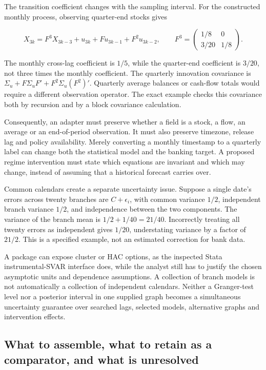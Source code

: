 The transition coefficient changes with the sampling interval. For the
constructed monthly process, observing quarter-end stocks gives

\[
 X_{3k}=F^3X_{3k-3}+u_{3k}+Fu_{3k-1}+F^2u_{3k-2},\qquad
 F^3=\begin{pmatrix}1/8&0\\3/20&1/8\end{pmatrix}.
\]

The monthly cross-lag coefficient is \(1/5\), while the quarter-end
coefficient is \(3/20\), not three times the monthly coefficient. The
quarterly innovation covariance is
\(\Sigma_u+F\Sigma_uF'+F^2\Sigma_u(F^2)'\). Quarterly average balances
or cash-flow totals would require a different observation operator. The
exact example checks this covariance both by recursion and by a block
covariance calculation.~\citep{exec13_ct_examples}

Consequently, an adapter must preserve whether a field is a stock, a
flow, an average or an end-of-period observation. It must also preserve
timezone, release lag and policy availability. Merely converting a
monthly timestamp to a quarterly label can change both the statistical
model and the banking target. A proposed regime intervention must state
which equations are invariant and which may change, instead of assuming
that a historical forecast carries over.

Common calendars create a separate uncertainty issue. Suppose a single
date's errors across twenty branches are \(C+\epsilon_i\), with common
variance \(1/2\), independent branch variance \(1/2\), and independence
between the two components. The variance of the branch mean is
\(1/2+1/40=21/40\). Incorrectly treating all twenty errors as
independent gives \(1/20\), understating variance by a factor of
\(21/2\). This is a specified example, not an estimated correction for
bank data. \citep{exec13_ct_examples}

A package can expose cluster or HAC options, as the inspected Stata
instrumental-SVAR interface does, while the analyst still has to justify
the chosen asymptotic units and dependence assumptions. A collection of
branch models is not automatically a collection of independent
calendars. Neither a Granger-test level nor a posterior interval in one
supplied graph becomes a simultaneous uncertainty guarantee over
searched lags, selected models, alternative graphs and intervention
effects.

\hypertarget{what-to-assemble-what-to-retain-as-a-comparator-and-what-is-unresolved}{%
\subsection{What to assemble, what to retain as a comparator, and what
is
unresolved}\label{what-to-assemble-what-to-retain-as-a-comparator-and-what-is-unresolved}}

